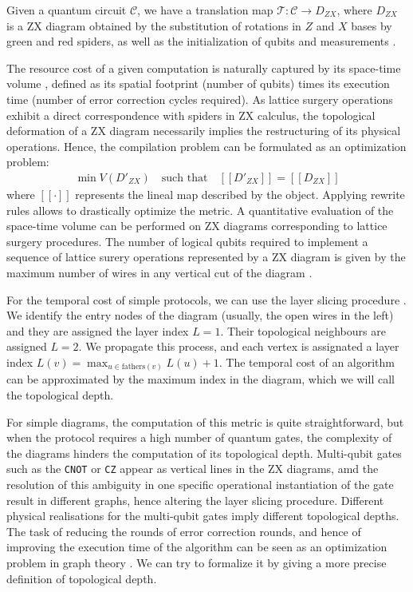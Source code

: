 \documentclass[12pt, twoside, openany]{book}
\begin{document}
Given a quantum circuit $\mathcal{C}$, we have a translation map $\mathcal{T}: \mathcal{C} \rightarrow D_{ZX}$, where $D_{ZX}$ is a ZX diagram obtained by the substitution of rotations in $Z$ and $X$ bases by green and red spiders, as well as the initialization of qubits and measurements \cite{vandaele2024qubitcountoptimizationusingzxcalculus}. 

The resource cost of a given computation is naturally captured by its space-time volume \cite{zhou2026topolslatticesurgerycompilation}, defined as its spatial footprint (number of qubits) times its execution time (number of error correction cycles required). As lattice surgery operations exhibit a direct correspondence with spiders in ZX calculus, the topological deformation of a ZX diagram necessarily implies the restructuring of its physical operations. Hence, the compilation problem can be formulated as an optimization problem:
\begin{align} \label{optimization}
    \min V(D'_{ZX}) \quad \text{such that} \quad [[D'_{ZX}]] = [[D_{ZX}]]
\end{align}
where $[[\cdot]]$ represents the lineal map described by the object. Applying rewrite rules allows to drastically optimize the metric. A quantitative evaluation of the space-time volume can be performed on ZX diagrams corresponding to lattice surgery procedures. The number of logical qubits required to implement a sequence of lattice surery operations represented by a ZX diagram is given by the maximum number of wires in any vertical cut of the diagram \cite{vandaele2024qubitcountoptimizationusingzxcalculus}.

For the temporal cost of simple protocols, we can use the layer slicing procedure \cite{zhou2026topolslatticesurgerycompilation}. We identify the entry nodes of the diagram (usually, the open wires in the left) and they are assigned the layer index $L = 1$. Their topological neighbours are assigned $L=2$. We propagate this process, and each vertex is assignated a layer index $L(v) = \max _{u \in \text{fathers}(v)} L(u) + 1$.  The temporal cost of an algorithm can be approximated by the maximum index in the diagram, which we will call the topological depth. 

For simple diagrams, the computation of this metric is quite straightforward, but when the protocol requires a high number of quantum gates, the complexity of the diagrams hinders the computation of its topological depth. Multi-qubit gates such as the \texttt{CNOT} or \texttt{CZ} appear as vertical lines in the ZX diagrams, amd the resolution of this ambiguity in one specific operational instantiation of the gate result in different graphs, hence altering the layer slicing procedure. Different physical realisations for the multi-qubit gates imply different topological depths. The task of reducing the rounds of error correction rounds, and hence of improving the execution time of the algorithm can be seen as an optimization problem in graph theory \cite{v1983data}. We can try to formalize it by giving a more precise definition of topological depth.
\end{document}
